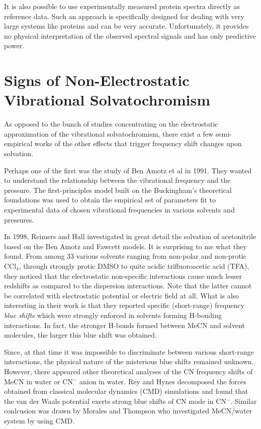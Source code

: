 \documentclass[a4paper,titlepage,twoside,fleqn,12pt]{book}
\begin{document}
\begin{refsection}
It is also possible to use experimentally measured protein spectra directly as reference data. 
Such an approach is specifically designed for dealing with very large systems like proteins and
can be very accurate. Unfortunately, it provides no physical interpretation of the observed
spectral signals and has only predictive power.

\section{Signs of Non-Electrostatic Vibrational Solvatochromism}
As opposed to the bunch of studies concentrating on the electrostatic
approximation of the vibrational solvatochromism, there exist a few 
semi-empirical works of the other effects that trigger frequency shift
changes upon solvation. 

Perhaps one of the first was the study of Ben Amotz et al in 1991.
They wanted to understand the relationship between the vibrational frequency
and the pressure. The first\hyp{}principles model built on the Buckingham's theoretical
foundations was used to obtain the empirical set of parameters fit to
experimental data of chosen vibrational frequencies in various solvents
and pressures.

In 1998, Reimers and Hall investigated in great detail the solvation of acetonitrile 
based on the Ben Amotz and Fawcett models. It is surprising to me what they found.
From among 33 various solvents ranging from non-polar and non-protic CCl$_4$, through strongly protic
DMSO to quite acidic trifluoroacetic acid (TFA), they noticed that the electrostatic
non-specific interactions cause much lesser redshifts as compared to the dispersion
interactions. Note that the latter cannot be correlated with electrostatic potential
or electric field at all. What is also interesting in their work is that they 
reported specific (short\hyp{}range) frequency \emph{blue shifts} which were strongly enforced
in solvents forming H-bonding interactions. In fact, the stronger H-bonds formed between MeCN
and solvent molecules, the larger this blue shift was obtained.

Since, at that time it was impossible to discriminate between various short-range
interactions, the physical nature of the misterious blue shifts remained unknown.
However, there appeared other theoretical analyses of the CN frequency shifts of MeCN in water
or CN$^-$ anion in water. Rey and Hynes\citep{Rey.Hynes.JCP.1998} decomposed the forces obtained from classical molecular dynamics
(CMD) simulations and found that the van der Waals potential exerts strong blue shifts of CN mode in CN$^-$.
Similar conlcusion was drawn by Morales and Thompson who investigated MeCN/water system by 
using CMD. 


\end{refsection}
\end{document}

